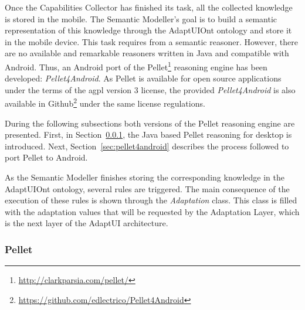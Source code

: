 Once the Capabilities Collector has finished its task, all the collected
knowledge is stored in the mobile. The Semantic Modeller's goal is to build a 
semantic representation of this knowledge through the AdaptUIOnt ontology and
store it in the mobile device. This task requires from a semantic reasoner. 
However, there are no available and remarkable reasoners written in Java and 
compatible with Android. Thus, an Android port of the 
Pellet\footnote{\url{http://clarkparsia.com/pellet/}} reasoning engine has been
developed: \textit{Pellet4Android}. As Pellet is available for open source
applications under the terms of the \ac{agpl} version 3 license, the provided
\textit{Pellet4Android} is also available in Github\footnote{\url{https://github.com/edlectrico/Pellet4Android}}
under the same license regulations.

During the following subsections both versions of the Pellet reasoning engine
are presented. First, in Section~\ref{sec:pellet}, the Java based Pellet reasoning
for desktop is introduced. Next, Section~\ref{sec:pellet4android} describes the
process followed to port Pellet to Android.

As the Semantic Modeller finishes storing the corresponding knowledge in the
AdaptUIOnt ontology, several rules are triggered. The main consequence of the
execution of these rules is shown through the \textit{Adaptation} class. This
class is filled with the adaptation values that will be requested by the
Adaptation Layer, which is the next layer of the AdaptUI architecture.


\subsubsection{Pellet}
\label{sec:pellet}


